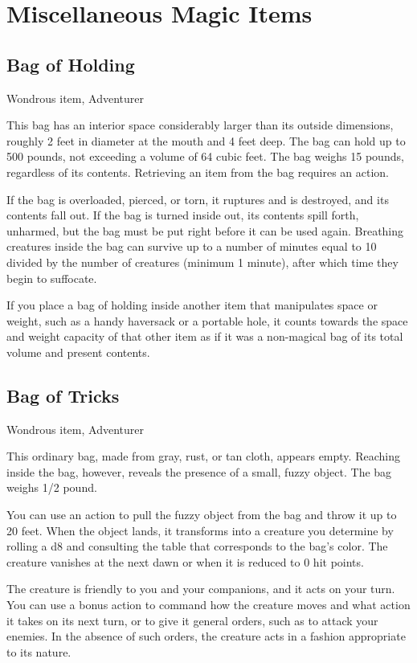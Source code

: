 \section{Miscellaneous Magic Items}\label{mi:misc}

\subsection{Bag of Holding}
Wondrous item, Adventurer 

This bag has an interior space considerably larger than its outside dimensions, roughly 2 feet in diameter at the mouth and 4 feet deep. The bag can hold up to 500 pounds, not exceeding a volume of 64 cubic feet. The bag weighs 15 pounds, regardless of its contents. Retrieving an item from the bag requires an action.

If the bag is overloaded, pierced, or torn, it ruptures and is destroyed, and its contents fall out. If the bag is turned inside out, its contents spill forth, unharmed, but the bag must be put right before it can be used again. Breathing creatures inside the bag can survive up to a number of minutes equal to 10 divided by the number of creatures (minimum 1 minute), after which time they begin to suffocate.

If you place a bag of holding inside another item that manipulates space or weight, such as a handy haversack or a portable hole, it counts towards the space and weight capacity of that other item as if it was a non-magical bag of its total volume and present contents.

\subsection{Bag of Tricks}
Wondrous item, Adventurer

This ordinary bag, made from gray, rust, or tan cloth, appears empty. Reaching inside the bag, however, reveals the presence of a small, fuzzy object. The bag weighs 1/2 pound.

You can use an action to pull the fuzzy object from the bag and throw it up to 20 feet. When the object lands, it transforms into a creature you determine by rolling a d8 and consulting the table that corresponds to the bag's color. The creature vanishes at the next dawn or when it is reduced to 0 hit points.

The creature is friendly to you and your companions, and it acts on your turn. You can use a bonus action to command how the creature moves and what action it takes on its next turn, or to give it general orders, such as to attack your enemies. In the absence of such orders, the creature acts in a fashion appropriate to its nature.

